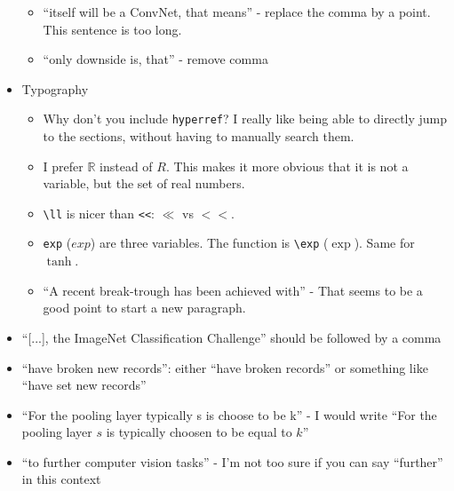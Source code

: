 \documentclass[a4paper,9pt]{scrartcl}
\begin{document}
\begin{itemize}
\begin{itemize}
        \item \enquote{itself will be a ConvNet, that means} - replace the comma by a point. This sentence is too long.
        \item \enquote{only downside is, that} - remove comma
    \end{itemize}
    \item Typography
    \begin{itemize}
        \item Why don't you include \texttt{hyperref}? I really like being able
              to directly jump to the sections, without having to manually
              search them.
        \item I prefer $\mathbb{R}$ instead of $R$. This makes it more obvious
              that it is not a variable, but the set of real numbers.
        \item \verb+\ll+ is nicer than \verb+<<+: $\ll$ vs $<<$.
        \item \verb+exp+ ($exp$) are three variables. The function is \verb+\exp+ ($\exp$). Same for $\tanh$.
        \item \enquote{A recent break-trough has been achieved with} - That seems to be a good point to start a new paragraph.
    \end{itemize}
    \item \enquote{[...], the ImageNet Classification Challenge} should be
          followed by a comma
    \item \enquote{have broken new records}: either \enquote{have broken records}
          or something like \enquote{have set new records}
    \item \enquote{For the pooling layer typically s is choose to be k} - I would write \enquote{For the pooling layer $s$ is typically choosen to be equal to $k$}
    \item \enquote{to further computer vision tasks} - I'm not too sure if you can say \enquote{further} in this context
\end{itemize}
\end{document}
